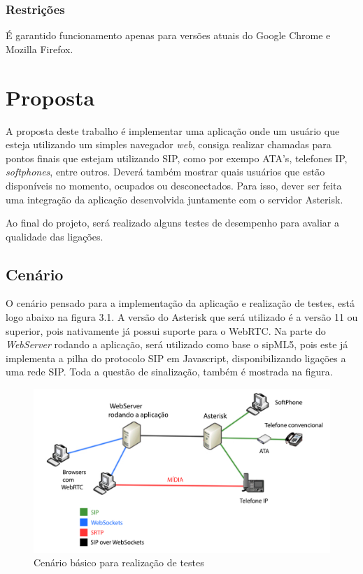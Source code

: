 \documentclass[12pt,a4paper,oneside]{report}
\begin{document}
\subsection{Restrições}
É garantido funcionamento apenas para versões atuais do Google Chrome e Mozilla Firefox.


\chapter{Proposta} %
\label{c_bibliografia} %

A proposta deste trabalho é implementar uma aplicação onde um usuário que esteja utilizando um simples navegador \textit{web}, consiga realizar chamadas para pontos finais que estejam utilizando SIP, como por exempo ATA's, telefones IP, \textit{softphones}, entre outros. Deverá também mostrar quais usuários que estão disponíveis no momento, ocupados ou desconectados.
Para isso, dever ser feita uma integração da aplicação desenvolvida juntamente com o servidor Asterisk.

Ao final do projeto, será realizado alguns testes de desempenho para avaliar a qualidade das ligações.

\section{Cenário}
\label{s_cenario} %

O cenário pensado para a implementação da aplicação e realização de testes, está logo abaixo na figura 3.1. A versão do Asterisk que será utilizado é a versão 11 ou superior, pois nativamente já possui suporte para o WebRTC. Na parte do \textit{WebServer} rodando a aplicação, será utilizado como base o sipML5, pois este já implementa a pilha do protocolo SIP em Javascript, disponibilizando ligações a uma rede SIP. Toda a questão de sinalização, também é mostrada na figura.

\begin{figure}[!htdb]
 \centering
  \includegraphics[width = 1\linewidth]{images/cenario}
  \caption{Cenário básico para realização de testes} %
  \label{f_cenario}
\end{figure}
\end{document}
